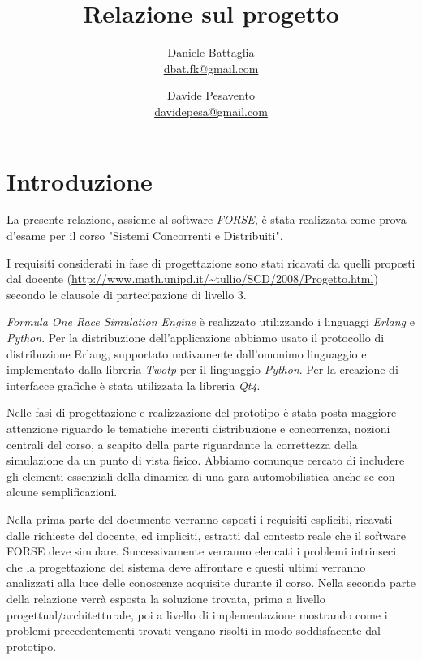 \documentclass[11pt,a4paper]{report}
\title{Relazione sul progetto}
\author{Daniele Battaglia\\\url{dbat.fk@gmail.com}
	\and Davide Pesavento\\\url{davidepesa@gmail.com}}
\date{}
\begin{document}
\maketitle

\tableofcontents

\clearpage

\chapter{Introduzione}
La presente relazione, assieme al software \textsl{FORSE}, è stata realizzata come prova d'esame per il corso "Sistemi Concorrenti e Distribuiti".

I requisiti considerati in fase di progettazione sono stati ricavati da quelli proposti dal docente (\url{http://www.math.unipd.it/~tullio/SCD/2008/Progetto.html})
secondo le clausole di partecipazione di livello 3.

\textsl{Formula One Race Simulation Engine} è realizzato utilizzando i linguaggi \textsl{Erlang} e \textsl{Python}. Per la distribuzione dell'applicazione abbiamo
usato il protocollo di distribuzione Erlang, supportato nativamente dall'omonimo linguaggio e implementato dalla libreria \textsl{Twotp} per il linguaggio
\textsl{Python}.
Per la creazione di interfacce grafiche è stata utilizzata la libreria \textsl{Qt4}.

Nelle fasi di progettazione e realizzazione del prototipo è stata posta maggiore attenzione riguardo le tematiche inerenti distribuzione e concorrenza, nozioni
centrali del corso, a scapito della parte riguardante la correttezza della simulazione da un punto di vista fisico. Abbiamo comunque cercato di includere
gli elementi essenziali della dinamica di una gara automobilistica anche se con alcune semplificazioni.

Nella prima parte del documento verranno esposti i requisiti espliciti, ricavati dalle richieste del docente, ed impliciti, estratti dal contesto reale che il software FORSE deve simulare.
Successivamente verranno elencati i problemi intrinseci che la progettazione del sistema deve affrontare e questi ultimi verranno analizzati alla luce delle conoscenze acquisite durante il corso.
Nella seconda parte della relazione verrà esposta la soluzione trovata, prima a livello progettual/architetturale, poi a livello di implementazione mostrando come i problemi precedentementi trovati vengano risolti in modo soddisfacente dal prototipo.
\end{document}
